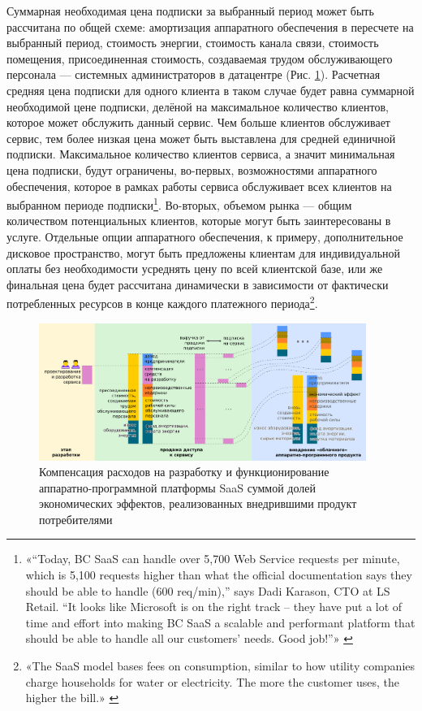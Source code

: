 \documentclass{article}
\begin{document}
Суммарная необходимая цена подписки за выбранный период может быть рассчитана по общей схеме: амортизация аппаратного обеспечения в пересчете на выбранный период, стоимость энергии, стоимость канала связи, стоимость помещения, присоединенная стоимость, создаваемая трудом обслуживающего персонала — системных администраторов в датацентре (Рис. \ref{fig:model_eco_effect_saas}). Расчетная средняя цена подписки для одного клиента в таком случае будет равна суммарной необходимой цене подписки, делёной на максимальное количество клиентов, которое может обслужить данный сервис. Чем больше клиентов обслуживает сервис, тем более низкая цена может быть выставлена для средней единичной подписки. Максимальное количество клиентов сервиса, а значит минимальная цена подписки, будут ограничены, во-первых, возможностями аппаратного обеспечения, которое в рамках работы сервиса обслуживает всех клиентов на выбранном периоде подписки\footnote{«“Today, BC SaaS can handle over 5,700 Web Service requests per minute, which is 5,100 requests higher than what the official documentation says they should be able to handle (600 req/min),” says Dadi Karason, CTO at LS Retail. “It looks like Microsoft is on the right track – they have put a lot of time and effort into making BC SaaS a scalable and performant platform that should be able to handle all our customers’ needs. Good job!”» \cite{erpSaas}}. Во-вторых, объемом рынка — общим количеством потенциальных клиентов, которые могут быть заинтересованы в услуге. Отдельные опции аппаратного обеспечения, к примеру, дополнительное дисковое пространство, могут быть предложены клиентам для индивидуальной оплаты без необходимости усреднять цену по всей клиентской базе, или же финальная цена будет рассчитана динамически в зависимости от фактически потребленных ресурсов в конце каждого платежного периода\footnote{«The SaaS model bases fees on consumption, similar to how utility companies charge households for water or electricity. The more the customer uses, the higher the bill.» \cite{sellingServices}}.

\begin{figure}[ht]
    \centering
    \includegraphics[width=0.95\textwidth]{model-eco-effect-saas}
    \caption{Компенсация расходов на разработку и функционирование аппаратно-программной платформы SaaS суммой долей экономических эффектов, реализованных внедрившими продукт потребителями}
    \label{fig:model_eco_effect_saas}
\end{figure}
\end{document}
